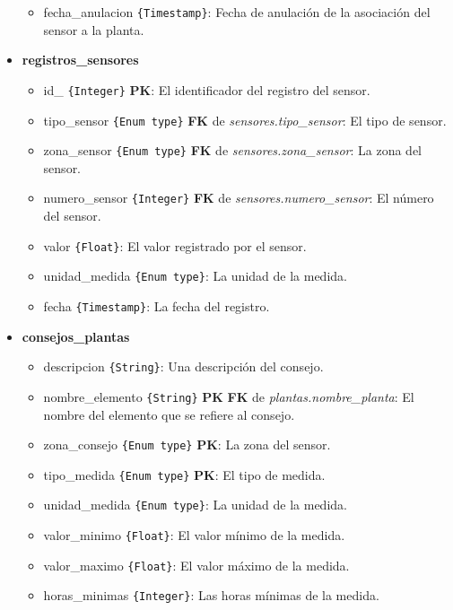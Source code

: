 \begin{itemize}
\begin{itemize}
                \item fecha\_anulacion \texttt{\{Timestamp\}}: Fecha de anulación de la asociación del sensor a la planta.
            \end{itemize}
            \item \textbf{registros\_sensores}
            \begin{itemize}
                \item id\_ \texttt{\{Integer\}} \textbf{PK}: El identificador del registro del sensor.
                \item tipo\_sensor \texttt{\{Enum type\}} \textbf{FK} de \textit{sensores.tipo\_sensor}: El tipo de sensor.
                \item zona\_sensor \texttt{\{Enum type\}} \textbf{FK} de \textit{sensores.zona\_sensor}: La zona del sensor.
                \item numero\_sensor \texttt{\{Integer\}} \textbf{FK} de \textit{sensores.numero\_sensor}: El número del sensor.
                \item valor \texttt{\{Float\}}: El valor registrado por el sensor.
                \item unidad\_medida \texttt{\{Enum type\}}: La unidad de la medida.
                \item fecha \texttt{\{Timestamp\}}: La fecha del registro.
            \end{itemize}
            \item \textbf{consejos\_plantas}
            \begin{itemize}
                \item descripcion \texttt{\{String\}}: Una descripción del consejo.
                \item nombre\_elemento \texttt{\{String\}} \textbf{PK} \textbf{FK} de \textit{ plantas.nombre\_planta}: El nombre del elemento que se refiere al consejo.
                \item zona\_consejo \texttt{\{Enum type\}} \textbf{PK}: La zona del sensor.
                \item tipo\_medida \texttt{\{Enum type\}} \textbf{PK}: El tipo de medida.
                \item unidad\_medida \texttt{\{Enum type\}}: La unidad de la medida.
                \item valor\_minimo \texttt{\{Float\}}: El valor mínimo de la medida.
                \item valor\_maximo \texttt{\{Float\}}: El valor máximo de la medida.
                \item horas\_minimas \texttt{\{Integer\}}: Las horas mínimas de la medida.

\end{itemize}
\end{itemize}
